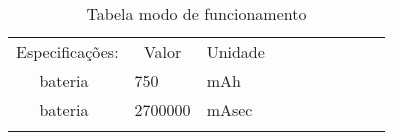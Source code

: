 \begin{table}[htp]
\caption{Tabela modo de funcionamento}
\vspace{0.5cm}
\label{tabela:tabela_modos_de_operacao}
\begin{tabular}{lllllllllll}
\cline{1-4}
\multicolumn{2}{|l|}{Especificações:}                                                                                    & \multicolumn{1}{c|}{Valor}                                    & \multicolumn{1}{c|}{Unidade}                        &                                                     &                                                      &                                                                        &                                                                      &                                                                        &                                                                     &                                                                     \\ \cline{1-4}
\multicolumn{1}{|l|}{}                                            & \multicolumn{1}{l|}{bateria}                         & \multicolumn{1}{l|}{750}                                      & \multicolumn{1}{l|}{mAh}                            &                                                     &                                                      &                                                                        &                                                                      &                                                                        &                                                                     &                                                                     \\ \cline{1-4}
\multicolumn{1}{|l|}{}                                            & \multicolumn{1}{l|}{bateria}                         & \multicolumn{1}{l|}{2700000}                                  & \multicolumn{1}{l|}{mAsec}                          &                                                     &                                                      &                                                                        &                                                                      &                                                                        &                                                                     &                                                                     \\ \cline{1-4}
                                                                  &                                                      &                                                               &                                                     &                                                     &                                                      &                                                                        &                                                                      &                                                                        &                                                                     &                                                                     \\ \hline

\end{tabular}
\end{table}
